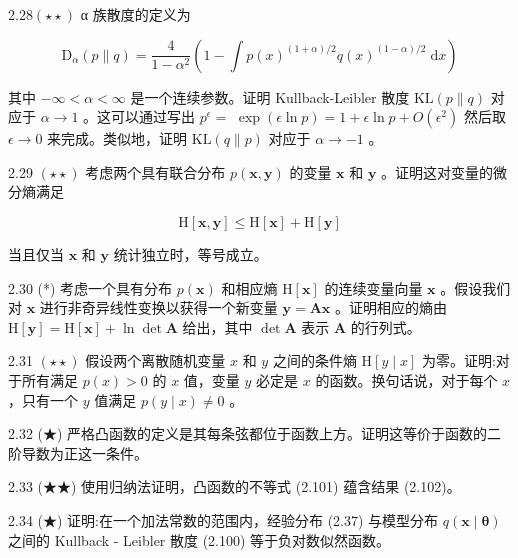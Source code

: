 \documentclass[10pt]{report}
\begin{document}
\({2.28}\left( {\star  \star  }\right)\) α 族散度的定义为

\[
{\mathrm{D}}_{\alpha }\left( {p\parallel q}\right)  = \frac{4}{1 - {\alpha }^{2}}\left( {1-\int p{\left( x\right) }^{\left( {1 + \alpha }\right) /2}q{\left( x\right) }^{\left( {1 - \alpha }\right) /2}\mathrm{\;d}x}\right)  \tag{2.129}
\]

其中 \(- \infty  < \alpha  < \infty\) 是一个连续参数。证明 Kullback-Leibler 散度 \(\mathrm{{KL}}\left( {p\parallel q}\right)\) 对应于 \(\alpha  \rightarrow  1\) 。这可以通过写出 \({p}^{\epsilon } =\)  \(\exp \left( {\epsilon \ln p}\right)  = 1 + \epsilon \ln p + O\left( {\epsilon }^{2}\right)\) 然后取 \(\epsilon  \rightarrow  0\) 来完成。类似地，证明 \(\mathrm{{KL}}\left( {q\parallel p}\right)\) 对应于 \(\alpha  \rightarrow   - 1\) 。

2.29 \(\left( {\star  \star  }\right)\) 考虑两个具有联合分布 \(p\left( {\mathbf{x},\mathbf{y}}\right)\) 的变量 \(\mathbf{x}\) 和 \(\mathbf{y}\) 。证明这对变量的微分熵满足

\[
\mathrm{H}\left\lbrack  {\mathbf{x},\mathbf{y}}\right\rbrack   \leq  \mathrm{H}\left\lbrack  \mathbf{x}\right\rbrack   + \mathrm{H}\left\lbrack  \mathbf{y}\right\rbrack   \tag{2.130}
\]

当且仅当 \(\mathbf{x}\) 和 \(\mathbf{y}\) 统计独立时，等号成立。

2.30 (*) 考虑一个具有分布 \(p\left( \mathbf{x}\right)\) 和相应熵 \(\mathrm{H}\left\lbrack  \mathbf{x}\right\rbrack\) 的连续变量向量 \(\mathbf{x}\) 。假设我们对 \(\mathbf{x}\) 进行非奇异线性变换以获得一个新变量 \(\mathbf{y} = \mathbf{A}\mathbf{x}\) 。证明相应的熵由 \(\mathrm{H}\left\lbrack  \mathbf{y}\right\rbrack   = \mathrm{H}\left\lbrack  \mathbf{x}\right\rbrack   + \ln \det \mathbf{A}\) 给出，其中 \(\det \mathbf{A}\) 表示 \(\mathbf{A}\) 的行列式。

2.31 \(\left( {\star  \star  }\right)\) 假设两个离散随机变量 \(x\) 和 \(y\) 之间的条件熵 \(\mathrm{H}\left\lbrack  {y \mid  x}\right\rbrack\) 为零。证明:对于所有满足 \(p\left( x\right)  > 0\) 的 \(x\) 值，变量 \(y\) 必定是 \(x\) 的函数。换句话说，对于每个 \(x\) ，只有一个 \(y\) 值满足 \(p\left( {y \mid  x}\right)  \neq  0\) 。

2.32 (★) 严格凸函数的定义是其每条弦都位于函数上方。证明这等价于函数的二阶导数为正这一条件。

2.33 (★★) 使用归纳法证明，凸函数的不等式 (2.101) 蕴含结果 (2.102)。

2.34 (★) 证明:在一个加法常数的范围内，经验分布 (2.37) 与模型分布 \(q\left( {\mathbf{x} \mid  \mathbf{\theta }}\right)\) 之间的 Kullback - Leibler 散度 (2.100) 等于负对数似然函数。
\end{document}
